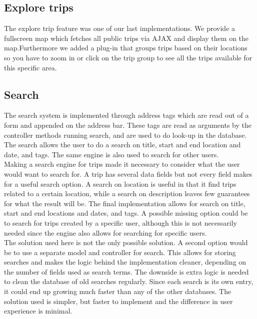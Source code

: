 \documentclass[a4paper]{article}
\begin{document}
\subsection{Explore trips}
The explore trip feature was one of our last implementations. We provide a fullscreen map which fetches all public trips via AJAX and display them on the map.Furthermore we added a plug-in that groups trips based on their locations so you have to zoom in or click on the trip group to see all the trips available for this specific area.

\subsection{Search}
The search system is implemented through address tags which are read out of a form and appended on the address bar. These tags are read as arguments by the controller methods running search, and are used to do look-up in the database. The search allows the user to do a search on title, start and end location and date, and tags. The same engine is also used to search for other users.\\

\noindent
Making a search engine for trips made it necessary to consider what the user would want to search for. A trip has several data fields but not every field makes for a useful search option. A search on location is useful in that it find trips related to a certain location, while a search on description leaves few guarantees for what the result will be. The final implementation allows for search on title, start and end locations and dates, and tags. A possible missing option could be to search for trips created by a specific user, although this is not necessarily needed since the engine also allows for searching for specific users.\\

\noindent
The solution used here is not the only possible solution. A second option would be to use a separate model and controller for search. This allows for storing searches and makes the logic behind the implementation cleaner, depending on the number of fields used as search terms. The downside is extra logic is needed to clean the database of old searches regularly. Since each search is its own entry, it could end up growing much faster than any of the other databases. The solution used is simpler, but faster to implement and the difference in user experience is minimal.\\
\end{document}
